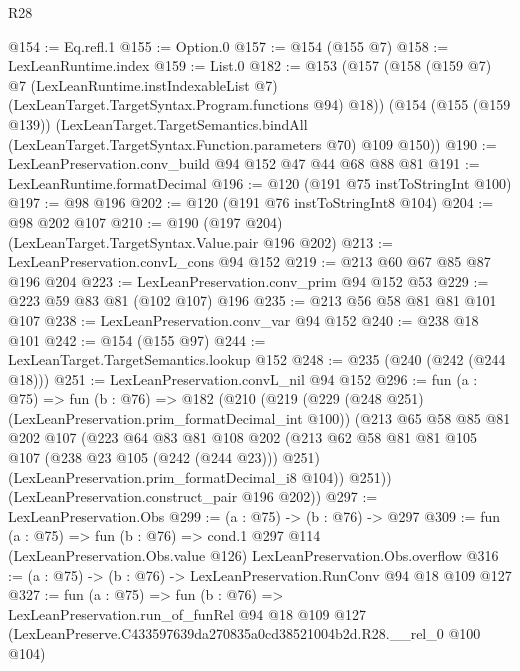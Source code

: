 \begin{lexlean}{R28}
\begin{coremodule}
@154 := Eq.refl.{1}
@155 := Option.{0}
@157 := @154 (@155 @7)
@158 := LexLeanRuntime.index
@159 := List.{0}
@182 := @153
    (@157
      (@158
        (@159 @7)
        @7
        (LexLeanRuntime.instIndexableList @7)
        (LexLeanTarget.TargetSyntax.Program.functions @94)
        @18))
    (@154
      (@155 (@159 @139))
      (LexLeanTarget.TargetSemantics.bindAll
        (LexLeanTarget.TargetSyntax.Function.parameters @70)
        @109
        @150))
@190 := LexLeanPreservation.conv_build @94 @152 @47 @44 @68 @88 @81
@191 := LexLeanRuntime.formatDecimal
@196 := @120 (@191 @75 instToStringInt @100)
@197 := @98 @196
@202 := @120 (@191 @76 instToStringInt8 @104)
@204 := @98 @202 @107
@210 := @190 (@197 @204) (LexLeanTarget.TargetSyntax.Value.pair @196 @202)
@213 := LexLeanPreservation.convL_cons @94 @152
@219 := @213 @60 @67 @85 @87 @196 @204
@223 := LexLeanPreservation.conv_prim @94 @152 @53
@229 := @223 @59 @83 @81 (@102 @107) @196
@235 := @213 @56 @58 @81 @81 @101 @107
@238 := LexLeanPreservation.conv_var @94 @152
@240 := @238 @18 @101
@242 := @154 (@155 @97)
@244 := LexLeanTarget.TargetSemantics.lookup @152
@248 := @235 (@240 (@242 (@244 @18)))
@251 := LexLeanPreservation.convL_nil @94 @152
@296 := fun (a : @75) =>
  fun (b : @76) =>
  @182
    (@210
      (@219
        (@229 (@248 @251) (LexLeanPreservation.prim_formatDecimal_int @100))
        (@213
          @65
          @58
          @85
          @81
          @202
          @107
          (@223
            @64
            @83
            @81
            @108
            @202
            (@213 @62 @58 @81 @81 @105 @107 (@238 @23 @105 (@242 (@244 @23))) @251)
            (LexLeanPreservation.prim_formatDecimal_i8 @104))
          @251))
      (LexLeanPreservation.construct_pair @196 @202))
@297 := LexLeanPreservation.Obs
@299 := (a : @75) -> (b : @76) -> @297
@309 := fun (a : @75) =>
  fun (b : @76) =>
  cond.{1} @297 @114 (LexLeanPreservation.Obs.value @126) LexLeanPreservation.Obs.overflow
@316 := (a : @75) -> (b : @76) -> LexLeanPreservation.RunConv @94 @18 @109 @127
@327 := fun (a : @75) =>
  fun (b : @76) =>
  LexLeanPreservation.run_of_funRel
    @94
    @18
    @109
    @127
    (LexLeanPreserve.C433597639da270835a0cd38521004b2d.R28.__rel_0 @100 @104)
\end{coremodule}
\end{lexlean}
